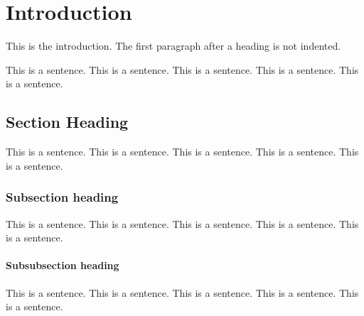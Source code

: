 %
%
%


\chapter{Introduction}

This is the introduction.
The first paragraph after a heading is not indented.

This is a sentence.
This is a sentence.
This is a sentence.
This is a sentence.
This is a sentence.


\section{Section Heading}

This is a sentence.
This is a sentence.
This is a sentence.
This is a sentence.
This is a sentence.


\subsection{Subsection heading}

This is a sentence.
This is a sentence.
This is a sentence.
This is a sentence.
This is a sentence.


\subsubsection{Subsubsection heading}

This is a sentence.
This is a sentence.
This is a sentence.
This is a sentence.
This is a sentence.